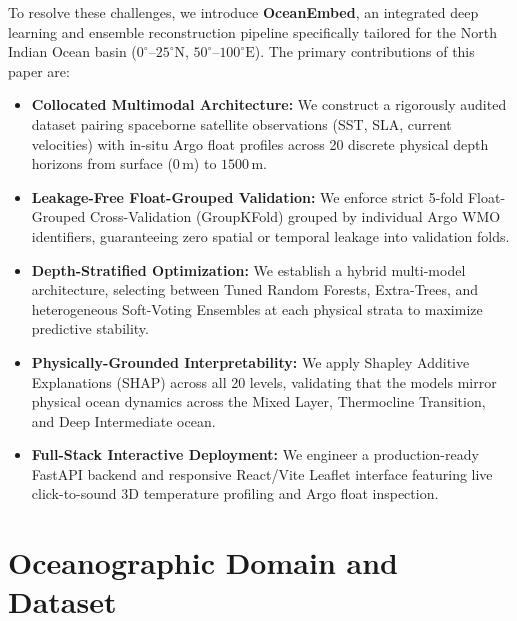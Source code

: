 \documentclass[conference]{IEEEtran}
\begin{document}
To resolve these challenges, we introduce \textbf{OceanEmbed}, an integrated deep learning and ensemble reconstruction pipeline specifically tailored for the North Indian Ocean basin ($0^\circ\text{--}25^\circ\text{N}$, $50^\circ\text{--}100^\circ\text{E}$). The primary contributions of this paper are:
\begin{itemize}
    \item \textbf{Collocated Multimodal Architecture:} We construct a rigorously audited dataset pairing spaceborne satellite observations (SST, SLA, current velocities) with in-situ Argo float profiles across 20 discrete physical depth horizons from surface ($0\,\text{m}$) to $1500\,\text{m}$.
    \item \textbf{Leakage-Free Float-Grouped Validation:} We enforce strict 5-fold Float-Grouped Cross-Validation (GroupKFold) grouped by individual Argo WMO identifiers, guaranteeing zero spatial or temporal leakage into validation folds.
    \item \textbf{Depth-Stratified Optimization:} We establish a hybrid multi-model architecture, selecting between Tuned Random Forests, Extra-Trees, and heterogeneous Soft-Voting Ensembles at each physical strata to maximize predictive stability.
    \item \textbf{Physically-Grounded Interpretability:} We apply Shapley Additive Explanations (SHAP) across all 20 levels, validating that the models mirror physical ocean dynamics across the Mixed Layer, Thermocline Transition, and Deep Intermediate ocean.
    \item \textbf{Full-Stack Interactive Deployment:} We engineer a production-ready FastAPI backend and responsive React/Vite Leaflet interface featuring live click-to-sound 3D temperature profiling and Argo float inspection.
\end{itemize}

\section{Oceanographic Domain and Dataset}
\label{sec:dataset}
\end{document}
